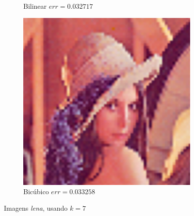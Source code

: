 \documentclass[12pt, a4paper]{article}
\begin{document}
\begin{figure}[h]
\begin{subfigure}{.3\textwidth}
            \caption{Bilinear $err = 0.032717$}
        \end{subfigure}
        \begin{subfigure}{.3\textwidth}
            \includegraphics[width=.95\textwidth]{../lenaBC7.png}
            \caption{Bicúbico $err = 0.033258$}
        \end{subfigure}
        \caption{Imagens \emph{lena}, usando $k=7$}
    \end{figure}
\end{document}
